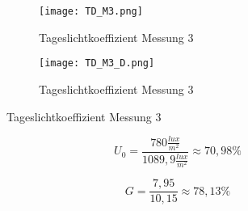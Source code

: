   \begin{figure}[H]
  \centering
  \begin{subfigure}[c]{0.5\textwidth}
      \texttt{[image: TD\_M3.png]}
      \caption{Tageslichtkoeffizient Messung 3}
      \label{fig:Tageslichtkoeffizient Messung 3}
  \end{subfigure}
  \hfill
  \begin{subfigure}[c]{0.45\textwidth}
      \texttt{[image: TD\_M3\_D.png]}
      \caption{Tageslichtkoeffizient Messung 3}
      \label{fig:Tageslichtkoeffizient Messung 3 Draufsicht}
  \end{subfigure}
  \label{fig:Messung 3 Tageslichtkoeffizient}
  \end{figure}

  $$U_0 = \frac{780\frac{lux}{m^2}}{1089,9\frac{lux}{m^2}}\approx 70,98\%$$

  $$G = \frac{7,95}{10,15}\approx 78,13\%$$